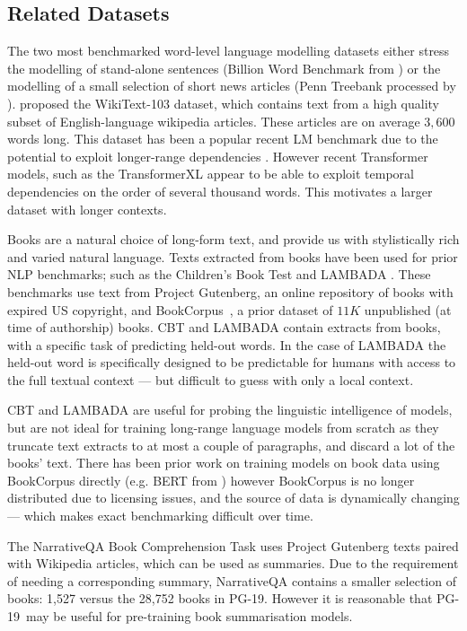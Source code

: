 \subsection{Related Datasets} The two most benchmarked word-level language modelling datasets either stress the modelling of stand-alone sentences (Billion Word Benchmark from \cite{chelba2013one}) or the modelling of a small selection of short news articles (Penn Treebank processed by \cite{mikolov2010recurrent}). \cite{merity2016pointer} proposed the WikiText-103 dataset, which contains text from a high quality subset of English-language wikipedia articles.  These articles are on average $3,600$ words long. This dataset has been a popular recent LM benchmark due to the potential to exploit longer-range dependencies \citep{grave2016improving, rae2018fast, bai2018trellis}. However recent Transformer models, such as the TransformerXL \citep{dai2019transformer} appear to be able to exploit temporal dependencies on the order of several thousand words. This motivates a larger dataset with longer contexts.

Books are a natural choice of long-form text, and provide us with stylistically rich and varied natural language. Texts extracted from books have been used for prior NLP benchmarks; such as the Children's Book Test \citep{hill2015goldilocks} and LAMBADA \citep{paperno2016lambada}. These benchmarks use text from Project Gutenberg, an online repository of books with expired US copyright, and BookCorpus~\citep{zhu2015aligning}, a prior dataset of $11K$ unpublished (at time of authorship) books. CBT and LAMBADA contain extracts from books, with a specific task of predicting held-out words. In the case of LAMBADA the held-out word is specifically designed to be predictable for humans with access to the full textual context --- but difficult to guess with only a local context.

CBT and LAMBADA are useful for probing the linguistic intelligence of models, but are not ideal for training long-range language models from scratch as they truncate text extracts to at most a couple of paragraphs, and discard a lot of the books' text. There has been prior work on training models on book data using BookCorpus directly (e.g. BERT from \citet{devlin2018bert}) however BookCorpus is no longer distributed due to licensing issues, and the source of data is dynamically changing --- which makes exact benchmarking difficult over time. 

The NarrativeQA Book Comprehension Task \citep{kovcisky2018narrativeqa} uses Project Gutenberg texts paired with Wikipedia articles, which can be used as summaries. Due to the requirement of needing a corresponding summary, NarrativeQA contains a smaller selection of books: 1,527 versus the 28,752 books in PG-19. However it is reasonable that PG-19~may be useful for pre-training book summarisation models.

